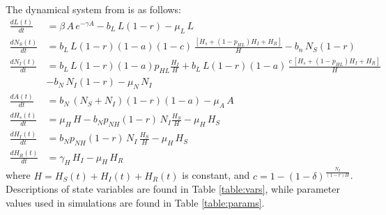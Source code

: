 \documentclass[12pt, centerh1]{article}
\begin{document}
The dynamical system from \citet{tosato2021host} is as follows:
\begin{align*}
    \frac{dL(t)}{dt} &= \beta \,A \, e^{-\gamma A} - b_L \,L (1-r) - \mu_L \,L \\
    \frac{dN_S(t)}{dt} &= b_L\,L(1-r)(1-a)(1-c) \, \frac{[H_s + (1- p_{HL})H_I + H_R]}{H} - b_n\,N_S (1-r) \\ 
    \frac{dN_I(t)}{dt} &= b_L \,L(1-r) (1-a) p_{HL} \frac{H_I}{H} + b_L \,L(1-r)(1-a)\,\frac{c \,[H_s + (1- p_{HL})H_I + H_R]}{H} \\
    &- b_N\, N_I (1-r) - \mu_N \,N_I\\
    \frac{dA(t)}{dt} &= b_N \,(N_S + N_I) (1-r) (1-a) - \mu_A \,A \\
    \frac{dH_s(t)}{dt} &= \mu_H \,H - b_N p_{NH}(1-r) \,N_I \frac{H_S}{H} - \mu_H \, H_S\\
    \frac{dH_I(t)}{dt} &= b_N p_{NH} (1-r)\, N_I \,\frac{H_S}{H} - \mu_H \, H_S \\
    \frac{dH_R(t)}{dt} &= \gamma_H \, H_I - \mu_H \, H_R
\end{align*}
where $H = H_S(t) + H_I(t) + H_R(t)$ is constant, and $\displaystyle c = 1 - (1-\delta)^{\frac{N_I}{(1-r)H}}$. Descriptions of state variables are found in Table \ref{table:vars}, while parameter values used in simulations are found in Table \ref{table:params}.

\begin{center}
\begin{table}[h!]
\footnotesize
\noindent{}
\caption{State variables in the model and their meanings.}
\label{table:vars}
\end{table}
\end{center}
\end{document}
